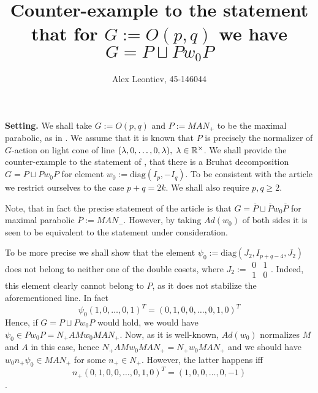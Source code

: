 \documentclass[10pt]{article} %
\author{Alex Leontiev, 45-146044}
\title{Counter-example to the statement that for $G:=O(p,q)$ we have $G=P\sqcup Pw_0P$}
\newcommand{\diag}{\mbox{diag}}
\begin{document}
\maketitle
\textbf{Setting.} We shall take $G:=O(p,q)$ and $P:=MAN_+$ to be the maximal parabolic, as in \cite{kmano}.
We assume that it is known that $P$ is precisely the normalizer
of $G$-action on light cone of line $(\lambda,0,\hdots,0,\lambda),\;\lambda\in\mathbb{R}^{\times}$.
We shall provide the counter-example to the statement of \cite{kmano},
that there is a Bruhat decomposition $G=P\sqcup Pw_0P$ for element $w_0:=\diag(I_p,-I_q)$. To be consistent with the article we restrict ourselves
to the case $p+q=2k$. We shall also require $p,q\geq2$.

Note, that in fact the precise statement of the article is that $G=\overline{P}\sqcup \overline{P}w_0\overline{P}$ for maximal parabolic
$\overline{P}:=MAN_-$. However, by taking $Ad(w_0)$ of both sides it is seen to be equivalent to the statement under consideration.

To be more precise we shall show that the element $\psi_0:=\diag(J_2,I_{p+q-4},J_2)$ does not belong to neither one of the double cosets, where $J_2:=\begin{smallmatrix}0&1\\1&0\end{smallmatrix}$. Indeed, this element clearly cannot belong to $P$, as it does not stabilize the aforementioned line. In fact
	\[\psi_0(1,0,\hdots,0,1)^T=(0,1,0,0,\hdots,0,1,0)^T\]
Hence, if $G=P\sqcup Pw_0P$ would hold, we would have $\psi_0\in Pw_0P=N_+AMw_0MAN_+$. Now, as it is well-known, $Ad(w_0)$ normalizes
$M$ and $A$ in this case, hence $N_+AMw_0MAN_+=N_+w_0MAN_+$ and we should have $w_0n_+\psi_0\in MAN_+$ for some $n_+\in N_+$. However, the
latter happens iff \begin{equation}n_+(0,1,0,0,\hdots,0,1,0)^T=(1,0,0,\hdots,0,-1)\label{Eq}\end{equation}.
\end{document}
